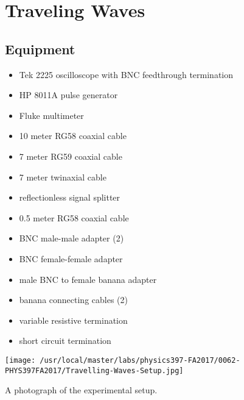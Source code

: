 

%
%


\setcounter{chapter}{4}
\setcounter{equation}{0}
\setcounter{table}{0}
\setcounter{figure}{0}
\chapter{Traveling Waves}

\section{Equipment}

\begin{minipage}[t]{0.5\textwidth}
\begin{itemize}[noitemsep]
\item Tek 2225 oscilloscope with BNC feedthrough termination
\item HP 8011A pulse generator
\item Fluke multimeter
\item 10 meter RG58 coaxial cable
\item 7 meter RG59 coaxial cable
\item 7 meter twinaxial cable
\item reflectionless signal splitter
\end{itemize}
\end{minipage}
\begin{minipage}[t]{0.5\textwidth}
\begin{itemize}[noitemsep]
\item 0.5 meter RG58 coaxial cable
\item BNC male-male adapter (2)
\item BNC female-female adapter
\item male BNC to female banana adapter
\item banana connecting cables (2)
\item variable resistive termination
\item short circuit termination
\end{itemize}
\end{minipage}

\begin{marginfigure}[+2in]
\texttt{[image: /usr/local/master/labs/physics397-FA2017/0062-PHYS397FA2017/Travelling-Waves-Setup.jpg]}
\caption{A photograph of the experimental setup.}
\label{fig:TWsetup}
\end{marginfigure}


